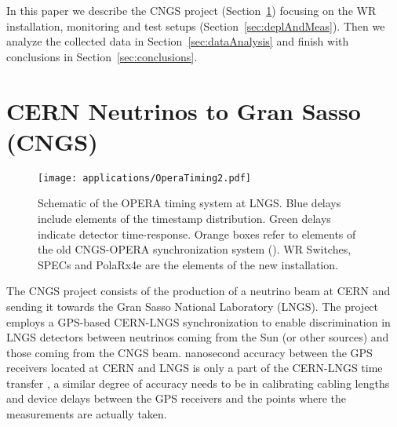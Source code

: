 In this paper we describe the CNGS project (Section~\ref{sec:CNGS}) focusing on the 
WR installation, monitoring and test setups (Section~\ref{sec:deplAndMeas}). 
Then we analyze the collected data in Section~\ref{sec:dataAnalysis} and finish with conclusions
in Section~\ref{sec:conclusions}.



\section{CERN Neutrinos to Gran Sasso (CNGS)}
\label{sec:CNGS}

\begin{figure}[!t]
\centering
\texttt{[image: applications/OperaTiming2.pdf]}
\caption{Schematic of the OPERA timing system at LNGS. Blue delays include elements of the 
timestamp distribution. Green delays indicate detector time-response. 
Orange boxes refer to elements of the old CNGS-OPERA synchronization system (\cite{biblio:TOF}). 
WR Switches, SPECs and PolaRx4e are the elements of the new installation.}
\label{fig:operaTiming}
\end{figure}


The CNGS project \cite{biblio:CNGS2000} consists of the production of a neutrino beam at CERN and sending
it towards the Gran Sasso National Laboratory (LNGS). The project employs a GPS-based CERN-LNGS 
synchronization \cite{biblio:BECOHT_CNGS} to enable discrimination in LNGS detectors between 
neutrinos coming from the Sun (or other sources) and those coming from the CNGS beam. 
 nanosecond accuracy between the GPS receivers located at CERN and LNGS is only a part of the 
CERN-LNGS time transfer , a similar degree of accuracy needs to be 
 in 
calibrating cabling lengths and device delays between the GPS receivers and the points where
the measurements are actually taken. 

